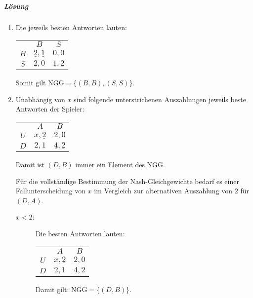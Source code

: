 \subparagraph{Lösung}%

\begin{enumerate}
  \item Die jeweils besten Antworten lauten:
    \begin{center}
      \begin{tabular}{ccc}
        & $B$ & $S$\\
        \cmidrule{2-3}
        $B$ & $\underline{2},\underline{1}$ & $0,0$\\
        \cmidrule{2-3}
        $S$ & $\underline{2},0$ & $\underline{1},\underline{2}$\\
        \cmidrule{2-3}
      \end{tabular}
    \end{center}
    Somit gilt $\text{NGG} = \{(B,B), (S,S)\}$.

  \item Unabhängig von $x$ sind folgende unterstrichenen Auszahlungen jeweils beste
    Antworten der Spieler:
    \begin{center}
      \begin{tabular}{ccc}
        & $A$ & $B$\\
        \cmidrule{2-3}
        $U$ & $x,\underline{2}$ & $2,0$\\
        \cmidrule{2-3}
        $D$ & $2,1$ & $\underline{4},\underline{2}$\\
        \cmidrule{2-3}
      \end{tabular}
    \end{center}
    Damit ist $(D,B)$ immer ein Element des NGG.

    Für die vollständige Bestimmung der Nash-Gleichgewichte bedarf es einer
    Fallunterscheidung von $x$ im Vergleich zur alternativen Auszahlung von $2$ für
    $(D,A)$.

    \begin{description}
      \item[$x<2$:] Die besten Antworten lauten:
        \begin{center}
          \begin{tabular}{ccc}
            & $A$ & $B$\\
            \cmidrule{2-3}
            $U$ & $x,\underline{2}$ & $2,0$\\
            \cmidrule{2-3}
            $D$ & $\underline{2},1$ & $\underline{4},\underline{2}$\\
            \cmidrule{2-3}
          \end{tabular}
        \end{center}
        Damit gilt: $\text{NGG} = \{(D,B)\}$.


\end{description}
\end{enumerate}
